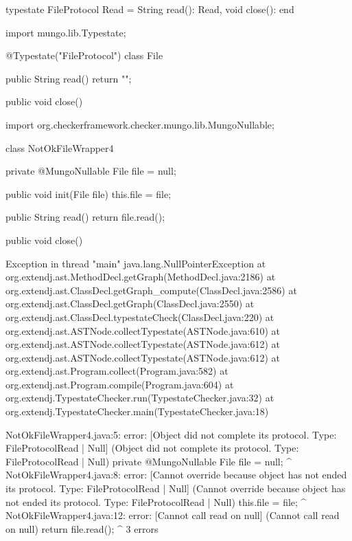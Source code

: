 \begin{code}
typestate FileProtocol {
  Read = {
    String read(): Read,
    void close(): end
  }
}\end{code}

\begin{code}
import mungo.lib.Typestate;

@Typestate("FileProtocol")
class File {

  public String read() {
    return "";
  }

  public void close() {
  }

}\end{code}

\begin{code}
import org.checkerframework.checker.mungo.lib.MungoNullable;

class NotOkFileWrapper4 {

  private @MungoNullable File file = null;

  public void init(File file) {
    this.file = file;
  }

  public String read() {
    return file.read();
  }

  public void close() {

  }

}\end{code}

\lstset{language=,caption=Original Mungo output}
\begin{code}
Exception in thread "main" java.lang.NullPointerException
	at org.extendj.ast.MethodDecl.getGraph(MethodDecl.java:2186)
	at org.extendj.ast.ClassDecl.getGraph_compute(ClassDecl.java:2586)
	at org.extendj.ast.ClassDecl.getGraph(ClassDecl.java:2550)
	at org.extendj.ast.ClassDecl.typestateCheck(ClassDecl.java:220)
	at org.extendj.ast.ASTNode.collectTypestate(ASTNode.java:610)
	at org.extendj.ast.ASTNode.collectTypestate(ASTNode.java:612)
	at org.extendj.ast.ASTNode.collectTypestate(ASTNode.java:612)
	at org.extendj.ast.Program.collect(Program.java:582)
	at org.extendj.ast.Program.compile(Program.java:604)
	at org.extendj.TypestateChecker.run(TypestateChecker.java:32)
	at org.extendj.TypestateChecker.main(TypestateChecker.java:18)
\end{code}

\lstset{language=,caption=New Mungo output}
\begin{code}
NotOkFileWrapper4.java:5: error: [Object did not complete its protocol. Type: FileProtocol{Read} | Null] (Object did not complete its protocol. Type: FileProtocol{Read} | Null)
  private @MungoNullable File file = null;
                              ^
NotOkFileWrapper4.java:8: error: [Cannot override because object has not ended its protocol. Type: FileProtocol{Read} | Null] (Cannot override because object has not ended its protocol. Type: FileProtocol{Read} | Null)
    this.file = file;
        ^
NotOkFileWrapper4.java:12: error: [Cannot call read on null] (Cannot call read on null)
    return file.read();
                    ^
3 errors
\end{code}

